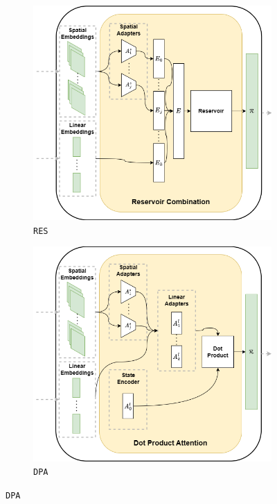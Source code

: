 \begin{figure}[ht]
    \centering
    \begin{subfigure}[b]{0.49\textwidth}
        \centering
        \includegraphics[width=\textwidth]{images/res}
        \caption{\texttt{RES}}
        \label{fig:reservoir_combination}
    \end{subfigure}
    \hfill
    \begin{subfigure}[b]{0.49\textwidth}
        \centering
        \includegraphics[width=\textwidth]{images/dpa}
        \caption{\texttt{DPA}}
        \label{fig:dpa}
    \end{subfigure}


\end{figure}
